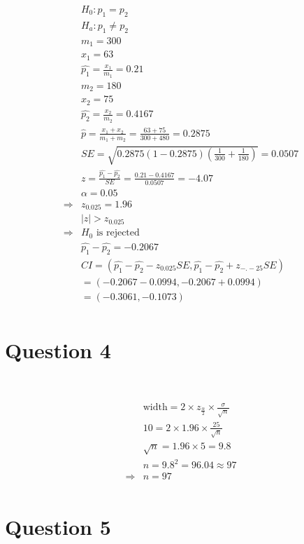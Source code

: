 \documentclass{article}
\begin{document}
\begin{align*}
    &H_0:p_1=p_2\\
    &H_a:p_1\ne p_2\\
    &m_1=300\\
    &x_1=63\\
    &\hat{p_1}=\frac{x_1}{m_1}=0.21\\
    &m_2=180\\
    &x_2=75\\
    &\hat{p_2}=\frac{x_2}{m_2}=0.4167\\
    &\hat{p}=\frac{x_1+x_2}{m_1+m_2}=\frac{63+75}{300+480}=0.2875\\
    &SE=\sqrt{0.2875(1-0.2875)(\frac{1}{300}+\frac{1}{180})}=0.0507\\
    &z=\frac{\hat{p_1}-\hat{p_2}}{SE}=\frac{0.21-0.4167}{0.0507}=-4.07\\
    &\alpha=0.05\\
    \Rightarrow&z_{0.025}=1.96\\
    &|z|>z_{0.025}\\
    \Rightarrow&H_0\text{ is rejected}\\
    &\hat{p_1}-\hat{p_2}=-0.2067\\
    &CI=(\hat{p_1}-\hat{p_2}-z_{0.025}SE,\hat{p_1}-\hat{p_2}+z_{-.-25}SE)\\
    &=(-0.2067-0.0994,-0.2067+0.0994)\\
    &=(-0.3061,-0.1073)\\
\end{align*}

\newpage

\section*{Question 4}

~

\begin{align*}
    &\text{width}=2\times z_{\frac{\alpha}{2}}\times\frac{\sigma}{\sqrt{n}}\\
    &10=2\times 1.96\times\frac{25}{\sqrt{n}}\\
    &\sqrt{n}=1.96\times5=9.8\\
    &n=9.8^2=96.04\approx97\\
    \Rightarrow&n=97\\
\end{align*}

\newpage

\section*{Question 5}
\end{document}
